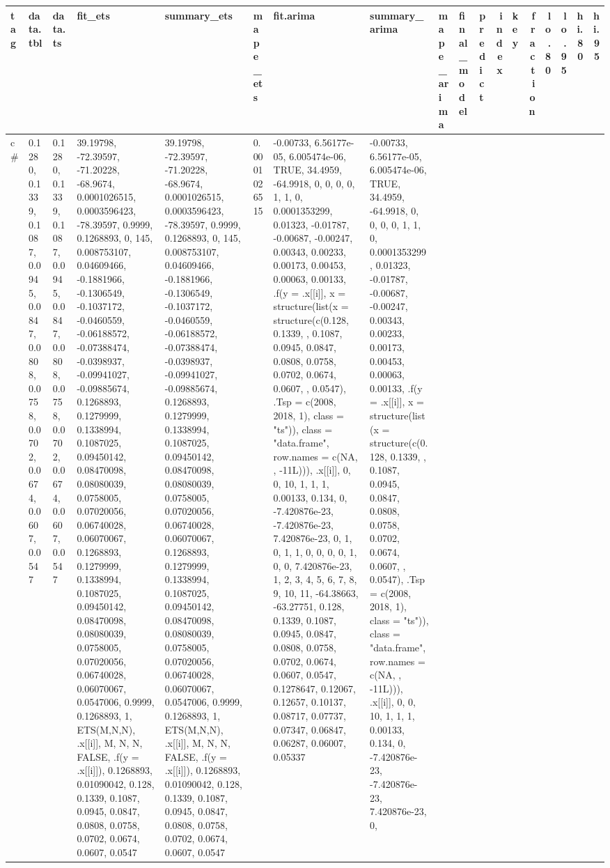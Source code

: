 \documentclass[
]{article}
\begin{document}
\begin{table}
\centering
\begin{tabular}{l|l|l|l|l|l|l|l|l|l|l|r|l|r|r|r|r|r}
\hline
tag & data.tbl & data.ts & fit\_ets & summary\_ets & mape\_ets & fit.arima & summary\_arima & mape\_arima & final\_model & predict & index & key & fraction & lo.80 & lo.95 & hi.80 & hi.95\\
\hline
c\# & 0.1280, 0.1339, 0.1087, 0.0945, 0.0847, 0.0808, 0.0758, 0.0702, 0.0674, 0.0607, 0.0547 & 0.1280, 0.1339, 0.1087, 0.0945, 0.0847, 0.0808, 0.0758, 0.0702, 0.0674, 0.0607, 0.0547 & 39.19798, -72.39597, -71.20228, -68.9674, 0.0001026515, 0.0003596423, -78.39597, 0.9999, 0.1268893, 0, 145, 0.008753107, 0.04609466, -0.1881966, -0.1306549, -0.1037172, -0.0460559, -0.06188572, -0.07388474, -0.0398937, -0.09941027, -0.09885674, 0.1268893, 0.1279999, 0.1338994, 0.1087025, 0.09450142, 0.08470098, 0.08080039, 0.0758005, 0.07020056, 0.06740028, 0.06070067, 0.1268893, 0.1279999, 0.1338994, 0.1087025, 0.09450142, 0.08470098, 0.08080039, 0.0758005, 0.07020056, 0.06740028, 0.06070067, 0.0547006, 0.9999, 0.1268893, 1, ETS(M,N,N), .x[[i]], M, N, N, FALSE, .f(y = .x[[i]]), 0.1268893, 0.01090042, 0.128, 0.1339, 0.1087, 0.0945, 0.0847, 0.0808, 0.0758, 0.0702, 0.0674, 0.0607, 0.0547 & 39.19798, -72.39597, -71.20228, -68.9674, 0.0001026515, 0.0003596423, -78.39597, 0.9999, 0.1268893, 0, 145, 0.008753107, 0.04609466, -0.1881966, -0.1306549, -0.1037172, -0.0460559, -0.06188572, -0.07388474, -0.0398937, -0.09941027, -0.09885674, 0.1268893, 0.1279999, 0.1338994, 0.1087025, 0.09450142, 0.08470098, 0.08080039, 0.0758005, 0.07020056, 0.06740028, 0.06070067, 0.1268893, 0.1279999, 0.1338994, 0.1087025, 0.09450142, 0.08470098, 0.08080039, 0.0758005, 0.07020056, 0.06740028, 0.06070067, 0.0547006, 0.9999, 0.1268893, 1, ETS(M,N,N), .x[[i]], M, N, N, FALSE, .f(y = .x[[i]]), 0.1268893, 0.01090042, 0.128, 0.1339, 0.1087, 0.0945, 0.0847, 0.0808, 0.0758, 0.0702, 0.0674, 0.0607, 0.0547 & 0.0001026515 & -0.00733, 6.56177e-05, 6.005474e-06, TRUE, 34.4959, -64.9918, 0, 0, 0, 0, 1, 1, 0, 0.0001353299, 0.01323, -0.01787, -0.00687, -0.00247, 0.00343, 0.00233, 0.00173, 0.00453, 0.00063, 0.00133, .f(y = .x[[i]], x = structure(list(x = structure(c(0.128, 0.1339, , 0.1087, 0.0945, 0.0847, 0.0808, 0.0758, 0.0702, 0.0674, 0.0607, , 0.0547), .Tsp = c(2008, 2018, 1), class = "ts")), class = "data.frame", row.names = c(NA, , -11L))), .x[[i]], 0, 0, 10, 1, 1, 1, 0.00133, 0.134, 0, -7.420876e-23, -7.420876e-23, 7.420876e-23, 0, 1, 0, 1, 1, 0, 0, 0, 0, 1, 0, 0, 7.420876e-23, 1, 2, 3, 4, 5, 6, 7, 8, 9, 10, 11, -64.38663, -63.27751, 0.128, 0.1339, 0.1087, 0.0945, 0.0847, 0.0808, 0.0758, 0.0702, 0.0674, 0.0607, 0.0547, 0.1278647, 0.12067, 0.12657, 0.10137, 0.08717, 0.07737, 0.07347, 0.06847, 0.06287, 0.06007, 0.05337 & -0.00733, 6.56177e-05, 6.005474e-06, TRUE, 34.4959, -64.9918, 0, 0, 0, 0, 1, 1, 0, 0.0001353299, 0.01323, -0.01787, -0.00687, -0.00247, 0.00343, 0.00233, 0.00173, 0.00453, 0.00063, 0.00133, .f(y = .x[[i]], x = structure(list(x = structure(c(0.128, 0.1339, , 0.1087, 0.0945, 0.0847, 0.0808, 0.0758, 0.0702, 0.0674, 0.0607, , 0.0547), .Tsp = c(2008, 2018, 1), class = "ts")), class = "data.frame", row.names = c(NA, , -11L))), .x[[i]], 0, 0, 10, 1, 1, 1, 0.00133, 0.134, 0, -7.420876e-23, -7.420876e-23, 7.420876e-23, 0, 
\end{tabular}
\end{table}
\end{document}
